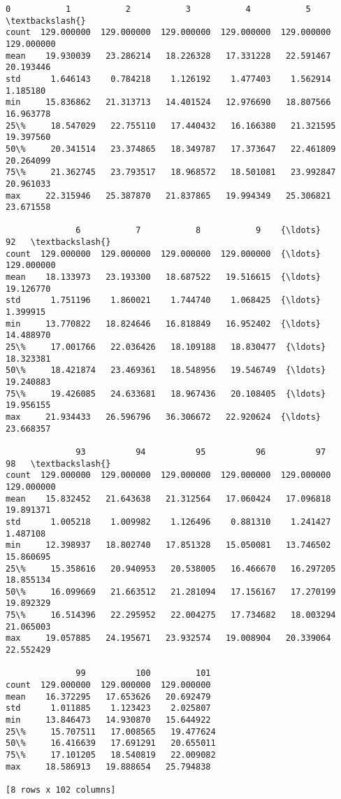 \documentclass[11pt]{article}
\makeatletter
\newcommand{\boxspacing}{\kern\kvtcb@left@rule\kern\kvtcb@boxsep}
\newcommand{\prompt}[4]{
        {\ttfamily\llap{{\color{#2}[#3]:\hspace{3pt}#4}}\vspace{-\baselineskip}}
    }
\makeatother
\begin{document}
            \begin{tcolorbox}[breakable, size=fbox, boxrule=.5pt, pad at break*=1mm, opacityfill=0]
\prompt{Out}{outcolor}{9}{\boxspacing}
\begin{Verbatim}[commandchars=\\\{\}]
              0           1           2           3           4           5    \textbackslash{}
count  129.000000  129.000000  129.000000  129.000000  129.000000  129.000000
mean    19.930039   23.286214   18.226328   17.331228   22.591467   20.193446
std      1.646143    0.784218    1.126192    1.477403    1.562914    1.185180
min     15.836862   21.313713   14.401524   12.976690   18.807566   16.963778
25\%     18.547029   22.755110   17.440432   16.166380   21.321595   19.397560
50\%     20.341514   23.374865   18.349787   17.373647   22.461809   20.264099
75\%     21.362745   23.793517   18.968572   18.501081   23.992847   20.961033
max     22.315946   25.387870   21.837865   19.994349   25.306821   23.671558

              6           7           8           9    {\ldots}         92   \textbackslash{}
count  129.000000  129.000000  129.000000  129.000000  {\ldots}  129.000000
mean    18.133973   23.193300   18.687522   19.516615  {\ldots}   19.126770
std      1.751196    1.860021    1.744740    1.068425  {\ldots}    1.399915
min     13.770822   18.824646   16.818849   16.952402  {\ldots}   14.488970
25\%     17.001766   22.036426   18.109188   18.830477  {\ldots}   18.323381
50\%     18.421874   23.469361   18.548956   19.546749  {\ldots}   19.240883
75\%     19.426085   24.633681   18.967436   20.108405  {\ldots}   19.956155
max     21.934433   26.596796   36.306672   22.920624  {\ldots}   23.668357

              93          94          95          96          97          98   \textbackslash{}
count  129.000000  129.000000  129.000000  129.000000  129.000000  129.000000
mean    15.832452   21.643638   21.312564   17.060424   17.096818   19.891371
std      1.005218    1.009982    1.126496    0.881310    1.241427    1.487108
min     12.398937   18.802740   17.851328   15.050081   13.746502   15.860695
25\%     15.358616   20.940953   20.538005   16.466670   16.297205   18.855134
50\%     16.099669   21.663512   21.281094   17.156167   17.270199   19.892329
75\%     16.514396   22.295952   22.004275   17.734682   18.003294   21.065003
max     19.057885   24.195671   23.932574   19.008904   20.339064   22.552429

              99          100         101
count  129.000000  129.000000  129.000000
mean    16.372295   17.653626   20.692479
std      1.011885    1.123423    2.025807
min     13.846473   14.930870   15.644922
25\%     15.707511   17.008565   19.477624
50\%     16.416639   17.691291   20.655011
75\%     17.101205   18.540819   22.009082
max     18.586913   19.888654   25.794838

[8 rows x 102 columns]
\end{Verbatim}
\end{tcolorbox}
        
\end{document}

